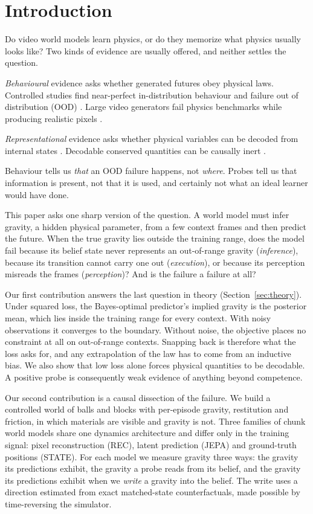 \section{Introduction}

Do video world models learn physics, or do they memorize what physics usually looks like? Two
kinds of evidence are usually offered, and neither settles the question.

\emph{Behavioural} evidence asks whether generated futures obey physical laws. Controlled studies
find near-perfect in-distribution behaviour and failure out of distribution (OOD)
\citep{kang2025far}. Large video generators fail physics benchmarks while producing realistic
pixels \citep{motamed2026physicsiq,zhang2025morpheus,thozhiyoor2025slower}.

\emph{Representational} evidence asks whether physical variables can be decoded from internal
states \citep{joseph2026interpreting,tan2026latent,interno2026observer}. Decodable conserved
quantities can be causally inert \citep{liao2026objective}.

Behaviour tells us \emph{that} an OOD failure happens, not \emph{where}. Probes tell us that
information is present, not that it is used, and certainly not what an ideal learner would have
done.

This paper asks one sharp version of the question. A world model must infer gravity, a hidden
physical parameter, from a few context frames and then predict the future. When the true gravity
lies outside the training range, does the model fail because its belief state never represents an
out-of-range gravity (\emph{inference}), because its transition cannot carry one out
(\emph{execution}), or because its perception misreads the frames (\emph{perception})? And is the
failure a failure at all?

Our first contribution answers the last question in theory (Section~\ref{sec:theory}). Under
squared loss, the Bayes-optimal predictor's implied gravity is the posterior mean, which lies inside
the training range for every context. With noisy observations it converges to the boundary. Without
noise, the objective places no constraint at all on out-of-range contexts. Snapping back is
therefore what the loss asks for, and any extrapolation of the law has to come from an inductive
bias. We also show that low loss alone forces physical quantities to be decodable. A positive probe
is consequently weak evidence of anything beyond competence.

Our second contribution is a causal dissection of the failure. We build a controlled world of
balls and blocks with per-episode gravity, restitution and friction, in which materials are visible
and gravity is not. Three families of chunk world models share one dynamics architecture and differ
only in the training signal: pixel reconstruction (REC), latent prediction (JEPA) and ground-truth
positions (STATE). For each model we measure gravity three ways: the gravity its predictions
exhibit, the gravity a probe reads from its belief, and the gravity its predictions exhibit when
we \emph{write} a gravity into the belief. The write uses a direction estimated from exact
matched-state counterfactuals, made possible by time-reversing the simulator.


